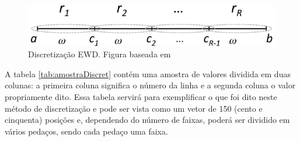 \begin{figure}[h] 
        \centering
        \includegraphics[scale=0.6]{figs/discretizacaoEWD.png}
        \caption[Discretização EWD]{Discretização EWD. Figura baseada em \cite{Lopes2016}}%
        \label{fig:faixasEWD}
\end{figure}

A tabela \ref{tab:amostraDiscret} contém uma amostra de valores dividida em duas colunas: a primeira coluna significa o número da linha e a segunda coluna o valor propriamente dito. Essa tabela servirá para exemplificar o que foi dito neste método de discretização e pode ser vista como um vetor de 150 (cento e cinquenta) posições e, dependendo do número de faixas, poderá ser dividido em vários pedaços, sendo cada pedaço uma faixa. 

